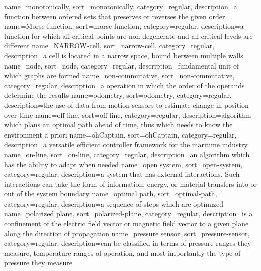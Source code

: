 %
{%
  name={monotonically},%
  sort={monotonically},%
  category={regular},%
  description={a function between ordered sets that preserves or reverses the given order}%
}
%
{%
  name={Morse function},%
  sort={morse-function},%
  category={regular},%
  description={a function for which all critical points are non-degenerate and all critical levels are different}%
}
%
{%
  name={NARROW-cell},%
  sort={narrow-cell},%
  category={regular},%
  description={a cell is located in a narrow space, bound between multiple walls}%
}
%
{%
  name={node},%
  sort={node},%
  category={regular},%
  description={fundamental unit of which graphs are formed}%
}
%
{%
  name={non-commutative},%
  sort={non-commutative},%
  category={regular},%
  description={a operation in which the order of the operands determine the results}%
}
%
{%
  name={odometry},%
  sort={odometry},%
  category={regular},%
  description={the use of data from motion sensors to estimate change in position over time}%
}
%
{%
  name={off-line},%
  sort={off-line},%
  category={regular},%
  description={algorithm which plans an optimal path ahead of time, thus which needs to know the environment a priori}%
}
%
{%
  name={ohCaptain},%
  sort={ohCaptain},%
  category={regular},%
  description={a versatile efficient controller framework for the maritime industry}%
}
%
{%
  name={on-line},%
  sort={on-line},%
  category={regular},%
  description={an algorithm which has the ability to adapt when needed}%
}
%
{%
  name={open system},%
  sort={open-system},%
  category={regular},%
  description={a system that has external interactions. Such interactions can take the form of information, energy, or material transfers into or out of the system boundary}%
}
%
{%
  name={optimal path},%
  sort={optimal-path},%
  category={regular},%
  description={a sequence of steps which are optimized}%
}
%
{%
  name={polarized plane},%
  sort={polarized-plane},%
  category={regular},%
  description={is a confinement of the electric field vector or magnetic field vector to a given plane along the direction of propagation}%
}
%
{%
  name={pressure sensor},%
  sort={pressure-sensor},%
  category={regular},%
  description={can be classified in terms of pressure ranges they measure, temperature ranges of operation, and most importantly the type of pressure they measure}%
}
